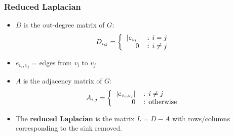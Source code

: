 \documentclass{beamer}
\begin{document}
\begin{frame}
\frametitle{Reduced Laplacian}
\begin{itemize}
  \item $D$ is the out-degree matrix of $G$:
  \[
  D_{i,j} = \left \{
  \begin{tabular}{rl}
    $|e_{v_i}|$ & : $i = j$ \\
    $0$ & : $i \neq j$
    \end{tabular}
    \right.
  \]

  \item $e_{v_i,v_j}$ = edges from ${v_i}$ to ${v_j}$
  \item $A$ is the adjacency matrix of $G$:
  \[
  A_{i,j} = \left \{
  \begin{tabular}{rl}
    $|e_{v_i,v_j}|$ & : $i \neq j$ \\
    $0$ & : otherwise
    \end{tabular}
    \right.
  \]


  \item The \textbf{reduced Laplacian} is the matrix $L = D - A$ with rows/columns
  corresponding to the sink removed.

\end{itemize}


\end{frame}
\end{document}
